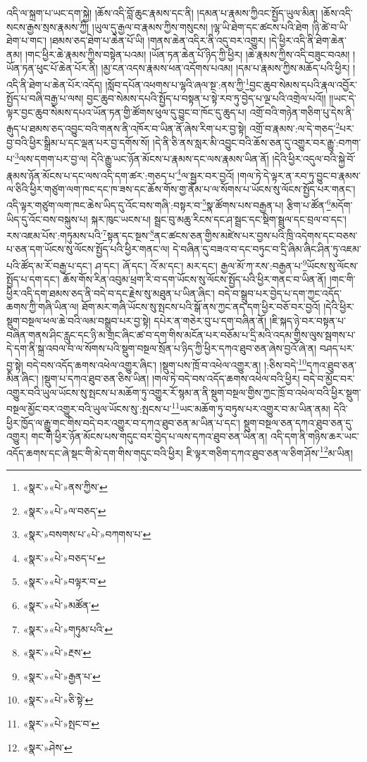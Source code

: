 འདི་ལ་སྐྲག་པ་ཡང་དག་སྐྱེ། །ཆོས་འདི་བློ་ཆུང་རྣམས་དང་ནི། །དམན་པ་རྣམས་ཀྱིའང་སྤྱོད་ཡུལ་མིན། །ཆོས་འདི་སངས་རྒྱས་སྲས་རྣམས་ཀྱི། །ཡུལ་དུ་རྒྱལ་བ་རྣམས་ཀྱིས་གསུངས། །ལྷ་ཡི་ཐེག་དང་ཚངས་པའི་ཐེག །ཉི་ཚེ་བ་ཡི་ཐེག་པ་གང་། །ཐམས་ཅད་ཐེག་པ་ཆེན་པོ་ཡི། །གནས་ཆེན་འདིར་ནི་འདུ་བར་འགྱུར། །དེ་ཕྱིར་འདི་ནི་ཐེག་ཆེན་ནམ། །གང་ཕྱིར་ཆེ་རྣམས་ཀྱིས་བསྟེན་པའམ། །ཡོན་ཏན་ཆེན་པོ་ཉིད་ཀྱི་ཕྱིར། །ཆེ་རྣམས་ཀྱིས་འདི་བཟུང་བའམ། །ཡོན་ཏན་ཕུང་པོ་ཆེན་པོར་ནི། །མྱ་ངན་འདས་རྣམས་ཕན་འདོགས་པའམ། །དམ་པ་རྣམས་ཀྱིས་མཆོད་པའི་ཕྱིར། །འདི་ནི་ཐེག་པ་ཆེན་པོར་འདོད། །སློབ་དཔོན་འཕགས་པ་ལྷའི་ཞལ་སྔ་:ནས་ཀྱི་\footnote{«སྣར་»«པེ་»ནས་ཀྱིས་}བྱང་ཆུབ་སེམས་དཔའི་རྣལ་འབྱོར་སྤྱོད་པ་བཞི་བརྒྱ་པ་ལས། བྱང་ཆུབ་སེམས་དཔའི་སྤྱོད་པ་བསྟན་པ་སྟེ་རབ་ཏུ་བྱེད་པ་ལྔ་པའི་འགྲེལ་པའོ།། །།ཡང་དེ་ལྟར་བྱང་ཆུབ་སེམས་དཔའ་ཡོན་ཏན་གྱི་ཚོགས་ཕུལ་དུ་བྱུང་བ་ཁོང་དུ་ཆུད་པ། འགྲོ་བའི་གཉེན་གཅིག་པུ་དེས་ནི་རྒུད་པ་ཐམས་ཅད་འབྱུང་བའི་གནས་ནི་འཁོར་བ་ཡིན་ནོ་ཞེས་རིག་པར་བྱ་སྟེ། འགྲོ་བ་རྣམས་:ལ་དེ་གཅད་\footnote{«སྣར་»«པེ་»ལ་བཅད་}པར་བྱ་བའི་ཕྱིར་སྒྲིམ་པ་དང་ལྡན་པར་བྱ་དགོས་སོ། །དེ་ནི་ཅི་ནས་སླར་མི་འབྱུང་བའི་ཆོས་ཅན་དུ་འགྱུར་བར་རྒྱུ་:བཀག་པ་\footnote{«སྣར་»བསགས་པ་«པེ་»བཀགས་པ་}ལས་དགག་པར་བྱ་ལ། དེའི་རྒྱུ་ཡང་ཉོན་མོངས་པ་རྣམས་དང་ལས་རྣམས་ཡིན་ནོ། །དེའི་ཕྱིར་འདུལ་བའི་སྐྱེ་བོ་རྣམས་ཉོན་མོངས་པ་དང་ལས་འདི་དག་ཚར་:གཅད་པ་\footnote{«སྣར་»«པེ་»བཅད་པ་}ལ་སྦྱར་བར་བྱའོ། །གལ་ཏེ་དེ་ལྟར་ན་རབ་ཏུ་བྱུང་བ་རྣམས་ལ་ཅིའི་ཕྱིར་གཙུག་ལག་ཁང་དང་ཁ་ཟས་དང་ཆོས་གོས་གྱ་ནོམ་པ་ལ་སོགས་པ་ཡོངས་སུ་ལོངས་སྤྱོད་པར་གནང་། འདི་ལྟར་གཙུག་ལག་ཁང་ཆེས་ཡིད་དུ་འོང་བས་གཞི་:བསྟར་བ་\footnote{«སྣར་»«པེ་»བལྟར་བ་}སྣ་ཚོགས་པས་བརྒྱན་པ། རྩིག་པ་ཚོན་\footnote{«སྣར་»«པེ་»མཚོན་}མདོག་ཡིད་དུ་འོང་བས་བསྐུས་པ། སྐར་ཁུང་ཡངས་པ། སྦྲང་བུ་མཆུ་རིངས་དང་ཤ་སྦྲང་དང་སྡིག་སྦྲུལ་དང་བྲལ་བ་དང་། རས་འཇམ་པོས་:གཏུམས་པའི་\footnote{«སྣར་»«པེ་»གཏུམ་པའི་}སྟན་དང་སྔས་\footnote{«སྣར་»«པེ་»རྔས་}ནང་ཚངས་ཅན་གྱིས་མཛེས་པར་བྱས་པའི་ཁྲི་འདེགས་དང་བཅས་པ་ཅན་དག་ཡོངས་སུ་ལོངས་སྤྱོད་པའི་ཕྱིར་གནང་ལ། དེ་བཞིན་དུ་བཟའ་བ་དང་བཏུང་བ་དྲི་ཞིམ་ཞིང་ཤིན་ཏུ་འཇམ་པའི་ཚོད་མ་རོ་བརྒྱ་པ་དང་། ཤ་དང་། ཞོ་དང་། འོ་མ་དང་། མར་དང་། རྒྱལ་མོ་ཀ་རས་:བརྒྱན་པ་\footnote{«སྣར་»«པེ་»རྒྱན་པ་}ཡོངས་སུ་ལོངས་སྤྱོད་པ་དག་དང་། ཆོས་གོས་རིན་འབུམ་ཕྲག་རི་བ་དག་ཡོངས་སུ་ལོངས་སྤྱོད་པའི་ཕྱིར་གནང་བ་ཡིན་ནོ། །གང་གི་ཕྱིར་འདི་དག་ཐམས་ཅད་ནི་བདེ་བ་དང་རྗེས་སུ་མཐུན་པ་ཡིན་ཞིང་། བདེ་བ་སྒྲུབ་པར་བྱེད་པ་དག་ཀྱང་འདོད་ཆགས་ཀྱི་གཞི་ཡིན་ལ། ཐོག་མར་གཞི་ཡོངས་སུ་སྤངས་པའི་སྒོ་ནས་ཀྱང་ནད་དག་ཕྱིར་བཅོ་བར་བྱའོ། །དེའི་ཕྱིར་སྡུག་བསྔལ་ཕལ་ཆེ་བའི་ལམ་བསྒྲུབ་པར་བྱ་སྟེ། དཔེར་ན་གཅེར་བུ་པ་དག་བཞིན་ནོ། །ཇི་སྐད་ཉེ་བར་བསྟན་པ་བཞིན་གནས་ཤིང་རླུང་དང་ཉི་མ་གྲང་ཞིང་ཚ་བ་དག་གིས་མངོན་པར་བཅོམ་པ་དྲི་མའི་འདམ་གྱིས་ལུས་སྦགས་པ་དེ་དག་ནི་སྐྲ་འབལ་བ་ལ་སོགས་པའི་སྡུག་བསྔལ་སྲོན་པ་ཉིད་ཀྱི་ཕྱིར་དཀའ་ཐུབ་ཅན་ཞེས་བྱའོ་ཞེ་ན། བཤད་པར་བྱ་སྟེ། བདེ་བས་འདོད་ཆགས་འཕེལ་འགྱུར་ཞིང་། །སྡུག་པས་ཁྲོ་བ་འཕེལ་འགྱུར་ན། །:ཅིས་བདེ་\footnote{«སྣར་»«པེ་»ཅི་སྟེ་}དཀའ་ཐུབ་ཅན་མིན་ཞིང་། །སྡུག་པ་དཀའ་ཐུབ་ཅན་ཅིས་ཡིན། །གལ་ཏེ་བདེ་བས་འདོད་ཆགས་འཕེལ་བའི་ཕྱིར། བདེ་བ་མྱོང་བར་འགྱུར་བའི་ཡུལ་ཡོངས་སུ་སྤངས་པ་མཆོག་ཏུ་འགྱུར་རོ་སྙམ་ན་ནི་སྡུག་བསྔལ་གྱིས་ཀྱང་ཁྲོ་བ་འཕེལ་བའི་ཕྱིར་སྡུག་བསྔལ་མྱོང་བར་འགྱུར་བའི་ཡུལ་ཡོངས་སུ་:སྤངས་པ་\footnote{«སྣར་»«པེ་»སྤང་བ་}ཡང་མཆོག་ཏུ་བཏུས་པར་འགྱུར་བ་མ་ཡིན་ནམ། དེའི་ཕྱིར་ཁྱོད་ལ་རྒྱུ་གང་གིས་བདེ་བར་འགྱུར་བ་དཀའ་ཐུབ་ཅན་མ་ཡིན་པ་དང་། སྡུག་བསྔལ་ཅན་དཀའ་ཐུབ་ཅན་དུ་འགྱུར། གང་གི་ཕྱིར་ཉོན་མོངས་པས་གདུང་བར་བྱེད་པ་ལས་དཀའ་ཐུབ་ཅན་ཡིན་ན། འདི་དག་ནི་གཉིས་ཆར་ཡང་འདོད་ཆགས་དང་ཞེ་སྡང་གི་མེ་དག་གིས་གདུང་བའི་ཕྱིར། ཇི་ལྟར་གཅིག་དཀའ་ཐུབ་ཅན་ལ་ཅིག་ཤོས་\footnote{«སྣར་»ཤེས་}མ་ཡིན། 